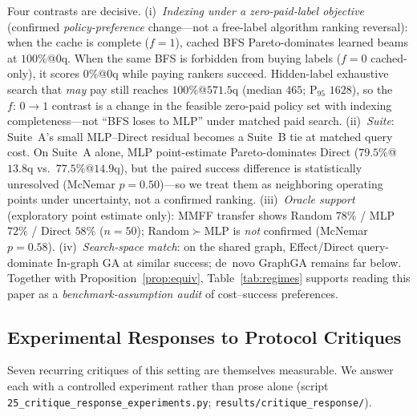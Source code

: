 Four contrasts are decisive. (i)~\emph{Indexing under a zero-paid-label objective} (confirmed \emph{policy-preference} change---not a free-label algorithm ranking reversal): when the cache is complete ($f{=}1$), cached BFS Pareto-dominates learned beams at $100\%$@$0$q. When the same BFS is forbidden from buying labels ($f{=}0$ cached-only), it scores $0\%$@$0$q while paying rankers succeed. Hidden-label exhaustive search that \emph{may} pay still reaches $100\%$@$571.5$q (median $465$; P$_{95}$ $1628$), so the $f{:}\,0\!\to\!1$ contrast is a change in the feasible zero-paid policy set with indexing completeness---not ``BFS loses to MLP'' under matched paid search. (ii)~\emph{Suite}: Suite~A's small MLP--Direct residual becomes a Suite~B tie at matched query cost. On Suite~A alone, MLP point-estimate Pareto-dominates Direct ($79.5\%$@$13.8$q vs.\ $77.5\%$@$14.9$q), but the paired success difference is statistically unresolved (McNemar $p{=}0.50$)---so we treat them as neighboring operating points under uncertainty, not a confirmed ranking. (iii)~\emph{Oracle support} (exploratory point estimate only): MMFF transfer shows Random $78\%$ / MLP $72\%$ / Direct $58\%$ ($n{=}50$); Random$\succ$MLP is \emph{not} confirmed (McNemar $p{=}0.58$). (iv)~\emph{Search-space match}: on the shared graph, Effect/Direct query-dominate In-graph GA at similar success; de~novo GraphGA remains far below. Together with Proposition~\ref{prop:equiv}, Table~\ref{tab:regimes} supports reading this paper as a \emph{benchmark-assumption audit} of cost--success preferences.

\subsection{Experimental Responses to Protocol Critiques}
\label{sec:critique_response}

Seven recurring critiques of this setting are themselves measurable. We answer each with a controlled experiment rather than prose alone (script \texttt{25\_critique\_response\_experiments.py}; \texttt{results/critique\_response/}).


